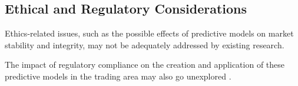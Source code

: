 \subsection{Ethical and Regulatory Considerations}

Ethics-related issues, such as the possible effects of predictive models on market stability and integrity, may not be adequately addressed by existing research.

The impact of regulatory compliance on the creation and application of these predictive models in the trading area may also go unexplored \citep{arner2015evolution}.






   


\def\baselinestretch{1.66}
\medskip


